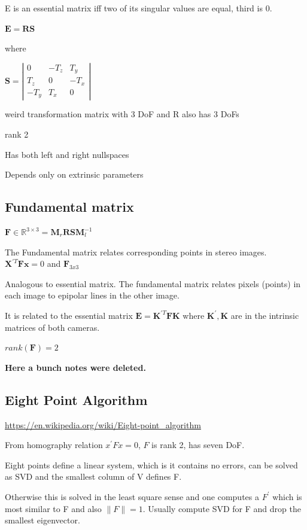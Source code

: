 E is an essential matrix iff two of its singular values are equal, third is 0.

$\mathbf{E}=\mathbf{RS}$

where 

$\mathbf{S} = \left| \begin{matrix} 0 & -T_z & T_y \\ T_z & 0 & -T_x \\ -T_y & T_x & 0  \end{matrix} \right|$

weird transformation matrix with 3 DoF and R also has 3 DoFs

rank 2 

Has both left and right nullspaces

Depends only on extrinsic parameters

\subsection{ Fundamental matrix}

$\mathbf F \in \mathbb{R}^{3\times3} = \mathbf{M}_r\mathbf{RSM}_l^{-1}$ 

The Fundamental matrix relates corresponding points in stereo images.
$\mathbf{X}^{\prime T}\mathbf{Fx}=0$ and $\mathbf{F}_{3x3}$

Analogous to essential matrix. The fundamental matrix relates pixels (points) in each image to epipolar lines in the other image.

It is related to the essential matrix $\mathbf{E} = \mathbf{K}^{\prime T} \mathbf{FK}$ where $\mathbf{K}^{\prime}, \mathbf{K}$ are in the intrinsic matrices of both cameras.

$rank(\mathbf{F}) = 2$

\textbf{Here a bunch notes were deleted.}

\subsection{Eight Point Algorithm}

\url{https://en.wikipedia.org/wiki/Eight-point_algorithm}

From homography relation $x^\prime F x = 0$, $F$ is rank 2, has seven DoF. 

Eight points define a linear system, which is it contains no errors, can be solved as SVD and the smallest column of V defines F.

Otherwise this is solved in the least square sense and one computes a $F^\prime$ which is most similar to F and also $\|F\|=1$. Usually compute SVD for F and drop the smallest eigenvector. 

